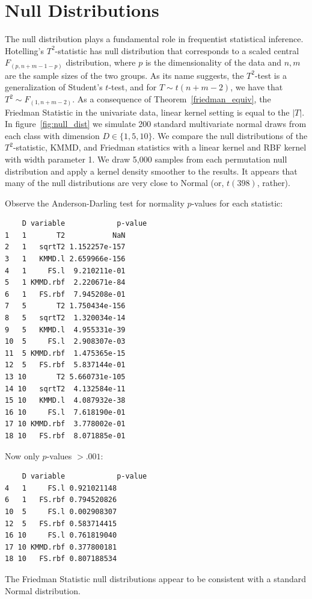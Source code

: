 \section{Null Distributions}
The null distribution plays a fundamental role in frequentist statistical
inference.  Hotelling's $T^2$-statistic has null distribution that
corresponds to a scaled central $F_{(p, n+m-1-p)}$ distribution, where
$p$ is the dimensionality of the data and $n, m$ are the sample sizes
of the two groups.  As its name suggests, the $T^2$-test is a
generalization of Student's $t$-test, and for $T \sim t(n+m-2)$, we
have that $T^2 \sim F_{(1, n+m-2)}$.  As a consequence of
Theorem~\ref{friedman_equiv}, the Friedman Statistic in the univariate
data, linear kernel setting is equal to the $|T|$.  In figure~\ref{fig:null_dist} we simulate
200 standard multivariate normal draws from each class with dimension
$D \in \{1, 5, 10\}$.  We compare the null distributions of the
$T^2$-statistic, KMMD, and Friedman statistics with a linear kernel
and RBF kernel with width parameter 1.  We draw 5,000 samples from
each permutation null distribution and apply a kernel density smoother
to the results.  It appears that many of the null distributions are
very close to Normal (or, $t(398)$, rather).  

Observe the Anderson-Darling test for normality $p$-values for each
statistic:
\begin{verbatim}
    D variable            p-value
1   1       T2           NaN
2   1   sqrtT2 1.152257e-157
3   1   KMMD.l 2.659966e-156
4   1     FS.l  9.210211e-01
5   1 KMMD.rbf  2.220671e-84
6   1   FS.rbf  7.945208e-01
7   5       T2 1.750434e-156
8   5   sqrtT2  1.320034e-14
9   5   KMMD.l  4.955331e-39
10  5     FS.l  2.908307e-03
11  5 KMMD.rbf  1.475365e-15
12  5   FS.rbf  5.837144e-01
13 10       T2 5.660731e-105
14 10   sqrtT2  4.132584e-11
15 10   KMMD.l  4.087932e-38
16 10     FS.l  7.618190e-01
17 10 KMMD.rbf  3.778002e-01
18 10   FS.rbf  8.071885e-01
\end{verbatim}

Now only $p$-values $> .001$:
\begin{verbatim}
    D variable            p-value
4   1     FS.l 0.921021148
6   1   FS.rbf 0.794520826
10  5     FS.l 0.002908307
12  5   FS.rbf 0.583714415
16 10     FS.l 0.761819040
17 10 KMMD.rbf 0.377800181
18 10   FS.rbf 0.807188534
\end{verbatim}

The Friedman Statistic null distributions appear to be consistent with
a standard Normal distribution.

